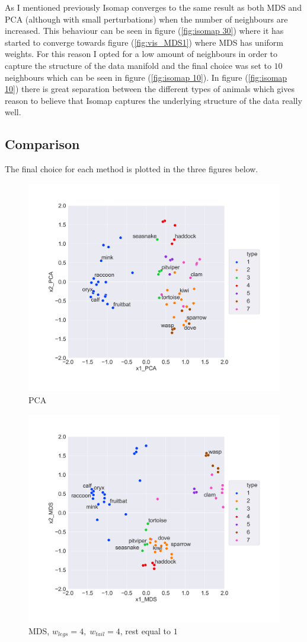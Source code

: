 As I mentioned previously Isomap converges to the same result as both MDS and PCA (although with small perturbations) when the number of neighbours are increased. This behaviour can be seen in figure (\ref{fig:isomap 30}) where it has started to converge towards figure (\ref{fig:vis_MDS1}) where MDS has uniform weights. For this reason I opted for a low amount of neighbours in order to capture the structure of the data manifold and the final choice was set to $10$ neighbours which can be seen in figure (\ref{fig:isomap 10}). In figure (\ref{fig:isomap 10}) there is great separation between the different types of animals which gives reason to believe that Isomap captures the underlying structure of the data really well.


\subsection*{Comparison}
The final choice for each method is plotted in the three figures below.

\begin{figure}[H]
  \centering
  \includegraphics[width = 0.8\linewidth]{../Visualization_PCA.png}
  \caption{PCA}
  \label{fig:PCA final}
\end{figure}

\begin{figure}[H]
  \centering
  \includegraphics[width = 0.8\linewidth]{../Visualization_MDS_with_weights.png}
  \caption{MDS, $w_{legs} = 4, \; w_{tail} = 4$, rest equal to $1$}
  \label{fig:MDS final}
\end{figure}

